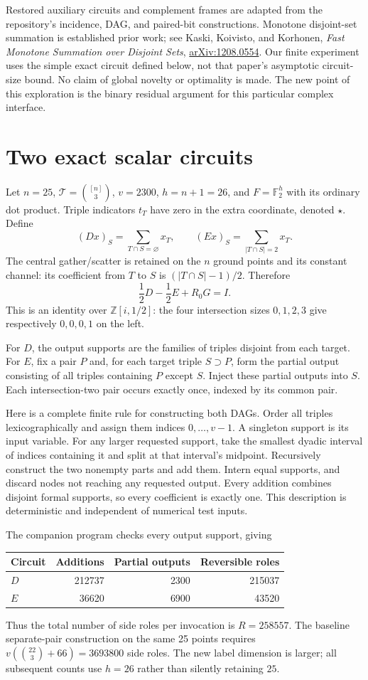 \documentclass[11pt]{article}
\newcommand{\FF}{\mathbb F_2}
\begin{document}
Restored auxiliary circuits and complement frames are adapted from the
repository's incidence, DAG, and paired-bit constructions. Monotone
disjoint-set summation is established prior work; see Kaski, Koivisto, and
Korhonen, \emph{Fast Monotone Summation over Disjoint Sets},
\href{https://arxiv.org/abs/1208.0554}{arXiv:1208.0554}.
Our finite experiment uses the simple exact circuit defined below, not that
paper's asymptotic circuit-size bound. No claim of global novelty or optimality
is made. The new point of this exploration is the binary residual argument
for this particular complex interface.

\section{Two exact scalar circuits}
Let $n=25$, $\mathcal T=\binom{[n]}3$, $v=2300$, $h=n+1=26$, and
$F=\FF^h$ with its ordinary dot product. Triple indicators $t_T$ have zero
in the extra coordinate, denoted $\star$. Define
\[
 (D x)_S=\sum_{T\cap S=\varnothing}x_T,\qquad
 (E x)_S=\sum_{|T\cap S|=2}x_T.
\]
The central gather/scatter is retained on the $n$ ground points and its
constant channel: its coefficient from $T$ to $S$ is
$(|T\cap S|-1)/2$. Therefore
\[
 \frac12D-\frac12E+R_0G=I.
\]
This is an identity over $\mathbb Z[i,1/2]$: the four intersection sizes
$0,1,2,3$ give respectively $0,0,0,1$ on the left.

For $D$, the output supports are the families of triples disjoint from each
target. For $E$, fix a pair $P$ and, for each target triple $S\supset P$,
form the partial output consisting of all triples containing $P$ except $S$.
Inject these partial outputs into $S$. Each intersection-two pair occurs
exactly once, indexed by its common pair.

Here is a complete finite rule for constructing both DAGs. Order all triples
lexicographically and assign them indices $0,\ldots,v-1$. A singleton support
is its input variable. For any larger requested support, take the smallest
dyadic interval of indices containing it and split at that interval's midpoint.
Recursively construct the two nonempty parts and add them. Intern equal
supports, and discard nodes not reaching any requested output. Every addition
combines disjoint formal supports, so every coefficient is exactly one.
This description is deterministic and independent of numerical test inputs.

The companion program checks every output support, giving
\begin{center}
\begin{tabular}{lrrr}
\toprule
Circuit & Additions & Partial outputs & Reversible roles\\
\midrule
$D$ & 212737 & 2300 & 215037\\
$E$ & 36620 & 6900 & 43520\\
\bottomrule
\end{tabular}
\end{center}
Thus the total number of side roles per invocation is $R=258557$.
The baseline separate-pair construction on the same 25 points requires
$v(\binom{22}3+66)=3693800$ side roles. The new label dimension is larger;
all subsequent counts use $h=26$ rather than silently retaining $25$.
\end{document}
